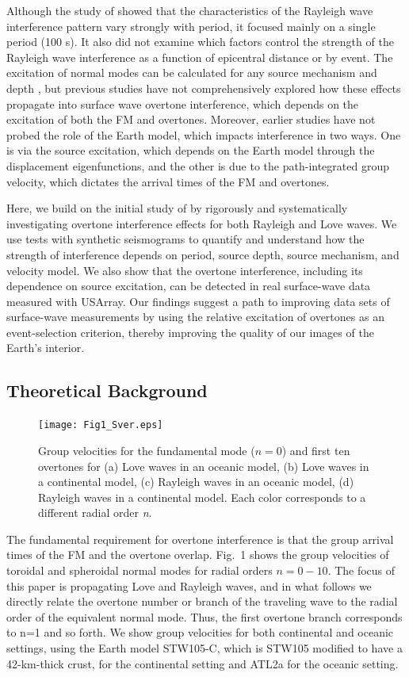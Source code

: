 \documentclass[extra,mreferee]{gji}
\begin{document}
Although the study of \citet{hariharan2020evidence} showed that the characteristics of the Rayleigh wave interference pattern vary strongly with period, it focused mainly on a single period (100 s). It also did not examine which factors control the strength of the Rayleigh wave interference as a function of epicentral distance or by event. The excitation of normal modes can be calculated for any source mechanism and depth \citep{dziewonski1981determination,dahlen1998theoretical}, but previous studies have not comprehensively explored how these effects propagate into surface wave overtone interference, which depends on the excitation of both the FM and overtones. Moreover, earlier studies have not probed the role of the Earth model, which impacts interference in two ways. One is via the source excitation, which depends on the Earth model through the displacement eigenfunctions, and the other is due to the path-integrated group velocity, which dictates the arrival times of the FM and overtones. 

Here, we build on the initial study of \citet{hariharan2020evidence} by rigorously and systematically investigating overtone interference effects for both Rayleigh and Love waves. We use tests with synthetic seismograms to quantify and understand how the strength of interference depends on period, source depth, source mechanism, and velocity model. We also show that the overtone interference, including its dependence on source excitation, can be detected in real surface-wave data measured with USArray. Our findings suggest a path to improving data sets of surface-wave measurements by using the relative excitation of overtones as an event-selection criterion, thereby improving the quality of our images of the Earth's interior.

 \subsection{Theoretical Background}

 \begin{figure}
 \texttt{[image: Fig1\_Sver.eps]}
 \caption{Group velocities for the fundamental mode ($n=0$) and first ten overtones for (a) Love waves in an oceanic model, (b) Love waves in a continental model, (c) Rayleigh waves in an oceanic model, (d) Rayleigh waves in a continental model. Each color corresponds to a different radial order \textit{n}.}
 \end{figure}
 
 The fundamental requirement for overtone interference is that the group arrival times of the FM and the overtone overlap. Fig.\ 1 shows the group velocities of toroidal and spheroidal normal modes for radial orders $n=0-10$. The focus of this paper is propagating Love and Rayleigh waves, and in what follows we directly relate the overtone number or branch of the traveling wave to the radial order of the equivalent normal mode. Thus, the first overtone branch corresponds to n=1 and so forth. We show group velocities for both continental and oceanic settings, using the Earth model STW105-C, which is STW105 \citep{kustowski2008anisotropic} modified to have a 42-km-thick crust, for the continental setting and ATL2a \citep{james2014rayleigh} for the oceanic setting. 
\end{document}
